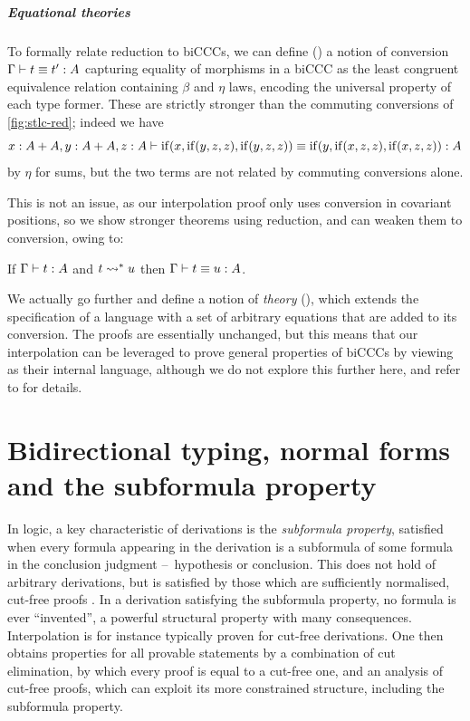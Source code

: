 \documentclass[a4paper,UKenglish,cleveref, autoref, thm-restate]{lipics-v2021}
\begin{document}
\subparagraph*{Equational theories}

To formally relate reduction to biCCCs, we can define
() a notion of conversion
\(\conv{\Gamma}{t}{t'}[A]\) capturing equality of morphisms in a biCCC
as the least congruent equivalence relation containing
\(\beta\) and \(\eta\) laws, encoding the
universal property of each type former.
These are strictly stronger than
the commuting conversions of \cref{fig:stlc-red}; indeed we have
\[\conv
  {x : A + A, y : A + A, z : A}
  {\ite{x}{\ite{y}{z}{z}}{\ite{y}{z}{z}}}
  {\ite{y}{\ite{x}{z}{z}}{\ite{x}{z}{z}}}
  [A]
\]
by \(\eta\) for sums, but the two terms are not related by commuting conversions
alone.

This is not an issue, as our interpolation proof only uses conversion
in covariant positions, so we show stronger theorems using reduction,
and can weaken them to conversion, owing to:
\begin{lemma}
  If \(\typing{\Gamma}{t}[A]\) and \(t \rightsquigarrow^* u\) then \(\conv{\Gamma}{t}{u}[A]\).
\end{lemma}
We actually go further and define a notion of \emph{theory}
(),
which extends the specification of a language with
a set of arbitrary equations that are added to its conversion.
The proofs are essentially unchanged, but this means that
our interpolation can be leveraged to prove general properties of
biCCCs by viewing \stlc as their internal language,
although we do not explore this further here, and refer to
\Cubric \cite{Cubric1994,Cubricphd} for details.

\section{Bidirectional typing, normal forms and the subformula property}
\label{sec:bidirectional}

In logic, a key characteristic of derivations is the \emph{subformula property}, satisfied
when every formula appearing in the derivation is a subformula of some formula
in the conclusion judgment --~hypothesis or conclusion. This
does not hold of arbitrary derivations, but is satisfied by those which
are sufficiently normalised, \ie cut-free proofs \cite{Girard1989}.
In a derivation satisfying the subformula property, no formula is ever ``invented'',
a powerful structural property with many consequences. Interpolation is
for instance typically proven for cut-free derivations.
One then obtains properties for all provable
statements by a combination of cut elimination, by which every
proof is equal to a cut-free one, and an analysis of cut-free proofs, which can
exploit its more constrained structure, including the subformula property.
\end{document}
